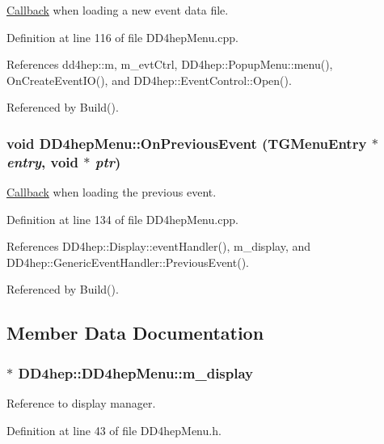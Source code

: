 \hyperlink{class_d_d4hep_1_1_callback}{Callback} when loading a new event data file. 

Definition at line 116 of file DD4hepMenu.cpp.

References dd4hep::m, m\_\-evtCtrl, DD4hep::PopupMenu::menu(), OnCreateEventIO(), and DD4hep::EventControl::Open().

Referenced by Build().\hypertarget{class_d_d4hep_1_1_d_d4hep_menu_aa5da4d833f39a73fe9f22e0b0016018e}{
\subsubsection[{OnPreviousEvent}]{\setlength{\rightskip}{0pt plus 5cm}void DD4hepMenu::OnPreviousEvent (TGMenuEntry $\ast$ {\em entry}, \/  void $\ast$ {\em ptr})}}
\label{class_d_d4hep_1_1_d_d4hep_menu_aa5da4d833f39a73fe9f22e0b0016018e}


\hyperlink{class_d_d4hep_1_1_callback}{Callback} when loading the previous event. 

Definition at line 134 of file DD4hepMenu.cpp.

References DD4hep::Display::eventHandler(), m\_\-display, and DD4hep::GenericEventHandler::PreviousEvent().

Referenced by Build().

\subsection{Member Data Documentation}
\hypertarget{class_d_d4hep_1_1_d_d4hep_menu_a684595fdba5b0f4fb8421ee39f75ad68}{
\subsubsection[{m\_\-display}]{$\ast$ {\bf DD4hep::DD4hepMenu::m\_\-display}}}
\label{class_d_d4hep_1_1_d_d4hep_menu_a684595fdba5b0f4fb8421ee39f75ad68}


Reference to display manager. 

Definition at line 43 of file DD4hepMenu.h.

